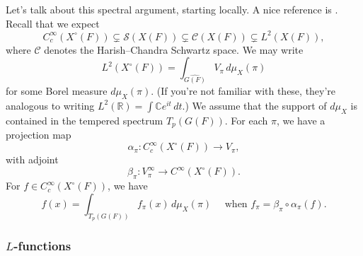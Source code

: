\documentclass[reqno]{amsart} 
\numberwithin{theorem}{section}
\numberwithin{equation}{section}
\numberwithin{exercise}{section}
\begin{document}
Let's talk about this spectral argument, starting locally.  A nice reference is \cite{MR1075727}.  Recall that we expect
\begin{equation*}
  C_c^\infty(X^{\circ}(F)) \subsetneq \mathcal{S}(X(F)) \subsetneq \mathcal{C}(X(F)) \subsetneq L^2(X(F)),
\end{equation*}
where $\mathcal{C}$ denotes the Harish--Chandra Schwartz space.  We may write
\begin{equation*}
  L^2(X^{\circ}(F)) = \int_{\widehat{G(F)}} V_\pi \, d \mu_X(\pi)
\end{equation*}
for some Borel measure $d \mu_X(\pi)$.  (If you're not familiar with these, they're analogous to writing $L^2(\mathbb{R}) = \int \mathbb{C} e^{i t} \, d t$.)  We assume that the support of $d \mu_X$ is contained in the tempered spectrum $T_p(G(F))$.  For each $\pi$, we have a projection map
\begin{equation*}
  \alpha_\pi : C_c^\infty(X^{\circ}(F)) \rightarrow V_\pi,
\end{equation*}
with adjoint
\begin{equation*}
  \beta_\pi : V_\pi^\infty \rightarrow C^\infty(X^{\circ}(F)).
\end{equation*}
For $f \in C_c^\infty(X^{\circ}(F))$, we have
\begin{equation*}
  f(x) = \int_{T_p(G(F))}
  f_\pi(x)
  \, d \mu_X(\pi)
  \quad
  \text{ when }
  f_\pi = \beta_\pi \circ \alpha_\pi(f).
\end{equation*}


\subsubsection{$L$-functions}\label{sec:cq6txpqktt}
\end{document}
